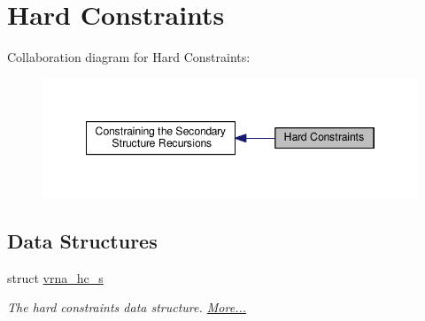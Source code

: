\hypertarget{group__hard__constraints}{\section{Hard Constraints}
\label{group__hard__constraints}
}
Collaboration diagram for Hard Constraints\-:
\nopagebreak
\begin{figure}[H]
\begin{center}
\leavevmode
\includegraphics[width=346pt]{group__hard__constraints}
\end{center}
\end{figure}
\subsection*{Data Structures}
\begin{DoxyCompactItemize}
\item 
struct \hyperlink{group__hard__constraints_structvrna__hc__s}{vrna\-\_\-hc\-\_\-s}
\begin{DoxyCompactList}\small\item\em The hard constraints data structure.  \hyperlink{group__hard__constraints_structvrna__hc__s}{More...}\end{DoxyCompactList}\end{DoxyCompactItemize}
